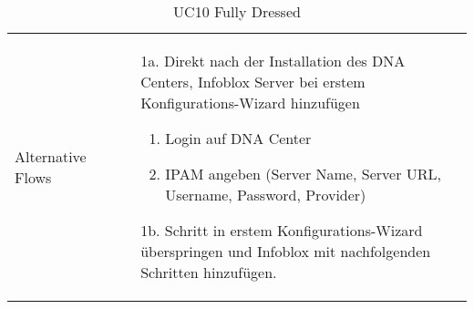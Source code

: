 \begin{table}[H]
\begin{tabularx}{\textwidth}{l | X}
		\\
		\hline
		Alternative Flows  & 
		\begin{itemize}
			\item[1a.] Direkt nach der Installation des DNA Centers, Infoblox Server bei erstem Konfigurations-Wizard hinzufügen
			\begin{enumerate}
				\item Login auf DNA Center
				\item IPAM angeben (Server Name, Server URL, Username, Password, Provider)
			\end{enumerate}
			\item[1b.] Schritt in erstem Konfigurations-Wizard überspringen und Infoblox mit nachfolgenden Schritten hinzufügen.
		\end{itemize}
	\end{tabularx}
	\caption{UC10 Fully Dressed}
	\label{tab:UC10}
\end{table}


